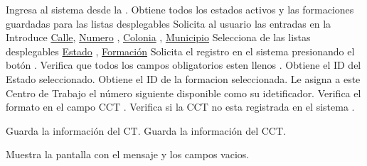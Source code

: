 \begin{UCtrayectoria}
	\UCpaso[\UCactor] Ingresa al sistema desde la .
  \UCpaso Obtiene todos los estados activos y las formaciones guardadas para las listas desplegables
	\UCpaso \label{UC4.Datos} Solicita al usuario las entradas en la  
	\UCpaso[\UCactor]  Introduce \hyperlink{CT.Calle}{Calle}, \hyperlink{CT.Numero}{Numero} , \hyperlink{CT.Colonia}{Colonia} , \hyperlink{CT.Municipio}{Municipio} 
    \UCpaso[\UCactor] Selecciona de las listas desplegables \hyperlink{Estado.Nombre}{Estado} , \hyperlink{Formacion.Nombre}{Formación} 
	\UCpaso[\UCactor] Solicita el registro en el sistema presionando el botón .
	 \UCpaso Verifica que todos los campos obligatorios esten llenos .
  \UCpaso Obtiene el ID del Estado seleccionado.
  \UCpaso Obtiene el ID de la formacion seleccionada.
  \UCpaso Le asigna a este Centro de Trabajo el número siguiente disponible como su idetificador.
  \UCpaso Verifica el formato en el campo CCT .
  \UCpaso Verifica si la CCT no esta registrada en el sistema .
  
   \UCpaso Guarda la información del CT.
  \UCpaso Guarda la información del CCT.
 
	\UCpaso \label{UC4.Mensaje} Muestra la pantalla  con el mensaje  y los campos vacios.
\end{UCtrayectoria}


